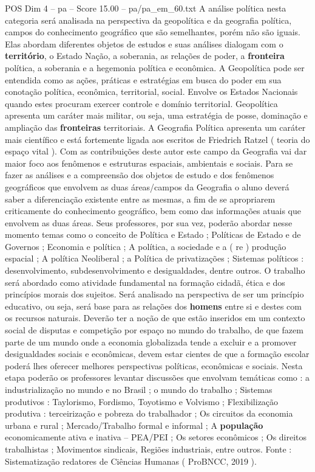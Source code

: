 \begin{textsample}{POS Dim 4 – pa – Score 15.00 – pa/pa\_em\_60.txt}
A análise política nesta categoria será analisada na perspectiva da geopolítica e da geografia política, campos do conhecimento geográfico que são semelhantes, porém não são iguais.
Elas abordam diferentes objetos de estudos e suas análises dialogam com o \textbf{território}, o Estado Nação, a soberania, as relações de poder, a \textbf{fronteira} política, a soberania e a hegemonia política e econômica.
A Geopolítica pode ser entendida como as ações, práticas e estratégias em busca do poder em sua conotação política, econômica, territorial, social.
Envolve os Estados Nacionais quando estes procuram exercer controle e domínio territorial.
Geopolítica apresenta um caráter mais militar, ou seja, uma estratégia de posse, dominação e ampliação das \textbf{fronteiras} territoriais.
A Geografia Política apresenta um caráter mais científico e está fortemente ligada aos escritos de Friedrich Ratzel ( teoria do espaço vital ).
Com as contribuições deste autor este campo da Geografia vai dar maior foco aos fenômenos e estruturas espaciais, ambientais e sociais.
Para se fazer as análises e a compreensão dos objetos de estudo e dos fenômenos geográficos que envolvem as duas áreas/campos da Geografia o aluno deverá saber a diferenciação existente entre as mesmas, a fim de se apropriarem criticamente do conhecimento geográfico, bem como das informações atuais que envolvem as duas áreas.
Seus professores, por sua vez, poderão abordar nesse momento temas como o conceito de Política e Estado ; Políticas de Estado e de Governos ; Economia e política ; A política, a sociedade e a ( re ) produção espacial ; A política Neoliberal ; a Política de privatizações ; Sistemas políticos : desenvolvimento, subdesenvolvimento e desigualdades, dentre outros.
O trabalho será abordado como atividade fundamental na formação cidadã, ética e dos princípios morais dos sujeitos.
Será analisado na perspectiva de ser um princípio educativo, ou seja, será base para as relações dos \textbf{homens} entre si e destes com os recursos naturais.
Deverão ter a noção de que estão inseridos em um contexto social de disputas e competição por espaço no mundo do trabalho, de que fazem parte de um mundo onde a economia globalizada tende a excluir e a promover desigualdades sociais e econômicas, devem estar cientes de que a formação escolar poderá lhes oferecer melhores perspectivas políticas, econômicas e sociais.
Nesta etapa poderão os professores levantar discussões que envolvam temáticas como : a industrialização no mundo e no Brasil ; o mundo do trabalho ; Sistemas produtivos : Taylorismo, Fordismo, Toyotismo e Volvismo ; Flexibilização produtiva : terceirização e pobreza do trabalhador ; Os circuitos da economia urbana e rural ; Mercado/Trabalho formal e informal ; A \textbf{população} economicamente ativa e inativa – PEA/PEI ; Os setores econômicos ; Os direitos trabalhistas ; Movimentos sindicais, Regiões industriais, entre outros.
Fonte : Sistematização redatores de Ciências Humanas ( ProBNCC, 2019 ).

\end{textsample}
